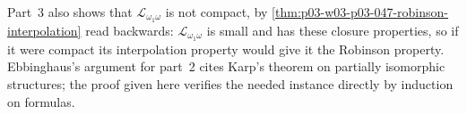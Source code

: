Part~3 also shows that \(\mathscr L_{\omega_1\omega}\) is not compact, by
\cref{thm:p03-w03-p03-047-robinson-interpolation} read backwards:
\(\mathscr L_{\omega_1\omega}\) is small and has these closure properties, so if
it were compact its interpolation property would give it the Robinson
property.
Ebbinghaus's argument for part~2 cites Karp's theorem on partially
isomorphic structures; the proof given here verifies the needed instance
directly by induction on formulas.
